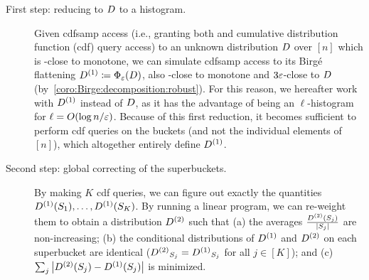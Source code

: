 \begin{description}
  \item[First step: reducing to $\D$ to a histogram.] 
Given cdfsamp access (i.e., granting both \SAMP and cumulative distribution function (cdf) query access) to an unknown distribution $\D$ over $[n]$ which is \eps-close to monotone, we can simulate cdfsamp access to its Birg\'e flattening $\D^{(1)} \eqdef \birge[\D]{\eps}$, also \eps-close to monotone and $3\eps$-close to $\D$ (by~\autoref{coro:Birge:decomposition:robust}). For this reason, we hereafter work with $\D^{(1)}$ instead of $\D$, as it has the advantage of being an $\ell$-histogram for $\ell=\bigO{{\log n}/{\eps}}$. {Because of this first reduction, it becomes sufficient to perform cdf queries on the buckets (and not the individual elements of $[n]$), which
altogether entirely define $\D^{(1)}$.}


  \item[Second step: global correcting of the superbuckets.] By making $K$ cdf queries, we can figure out exactly the quantities $\D^{(1)}(\supb_1), \dots, \D^{(1)}(\supb_K)$. By running a linear program, we can re-weight them to obtain a distribution $\D^{(2)}$ such that \textsf{(a)} the averages $\frac{\D^{(2)}(\supb_j)}{\abs{\supb_j}}$ are non-increasing; \textsf{(b)} the conditional distributions of $\D^{(1)}$ and $\D^{(2)}$ on each superbucket are identical (${\D^{(2)}}_{\supb_j} = {\D^{(1)}}_{\supb_j}$ for all $j\in[K]$); and \textsf{(c)} $\sum_j \abs{ \D^{(2)}(\supb_j) - \D^{(1)}(\supb_j)}$ is minimized.



\end{description}
